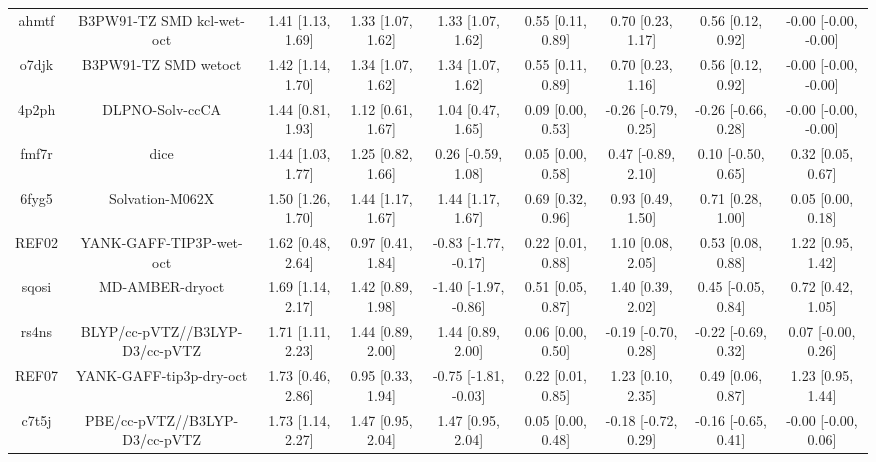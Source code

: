 \documentclass{article}
\begin{document}
\begin{center}
\begin{longtable}{|ccccccccc|}
 ahmtf &                          B3PW91-TZ SMD kcl-wet-oct &  1.41 [1.13, 1.69] &  1.33 [1.07, 1.62] &     1.33 [1.07, 1.62] &  0.55 [0.11, 0.89] &    0.70 [0.23, 1.17] &    0.56 [0.12, 0.92] &  -0.00 [-0.00, -0.00] \\
 o7djk &                               B3PW91-TZ SMD wetoct &  1.42 [1.14, 1.70] &  1.34 [1.07, 1.62] &     1.34 [1.07, 1.62] &  0.55 [0.11, 0.89] &    0.70 [0.23, 1.16] &    0.56 [0.12, 0.92] &  -0.00 [-0.00, -0.00] \\
 4p2ph &                                    DLPNO-Solv-ccCA &  1.44 [0.81, 1.93] &  1.12 [0.61, 1.67] &     1.04 [0.47, 1.65] &  0.09 [0.00, 0.53] &  -0.26 [-0.79, 0.25] &  -0.26 [-0.66, 0.28] &  -0.00 [-0.00, -0.00] \\
 fmf7r &                                               dice &  1.44 [1.03, 1.77] &  1.25 [0.82, 1.66] &    0.26 [-0.59, 1.08] &  0.05 [0.00, 0.58] &   0.47 [-0.89, 2.10] &   0.10 [-0.50, 0.65] &     0.32 [0.05, 0.67] \\
 6fyg5 &                                    Solvation-M062X &  1.50 [1.26, 1.70] &  1.44 [1.17, 1.67] &     1.44 [1.17, 1.67] &  0.69 [0.32, 0.96] &    0.93 [0.49, 1.50] &    0.71 [0.28, 1.00] &     0.05 [0.00, 0.18] \\
 REF02 &                            YANK-GAFF-TIP3P-wet-oct &  1.62 [0.48, 2.64] &  0.97 [0.41, 1.84] &  -0.83 [-1.77, -0.17] &  0.22 [0.01, 0.88] &    1.10 [0.08, 2.05] &    0.53 [0.08, 0.88] &     1.22 [0.95, 1.42] \\
 sqosi &                                    MD-AMBER-dryoct &  1.69 [1.14, 2.17] &  1.42 [0.89, 1.98] &  -1.40 [-1.97, -0.86] &  0.51 [0.05, 0.87] &    1.40 [0.39, 2.02] &   0.45 [-0.05, 0.84] &     0.72 [0.42, 1.05] \\
 rs4ns &                     BLYP/cc-pVTZ//B3LYP-D3/cc-pVTZ &  1.71 [1.11, 2.23] &  1.44 [0.89, 2.00] &     1.44 [0.89, 2.00] &  0.06 [0.00, 0.50] &  -0.19 [-0.70, 0.28] &  -0.22 [-0.69, 0.32] &    0.07 [-0.00, 0.26] \\
 REF07 &                            YANK-GAFF-tip3p-dry-oct &  1.73 [0.46, 2.86] &  0.95 [0.33, 1.94] &  -0.75 [-1.81, -0.03] &  0.22 [0.01, 0.85] &    1.23 [0.10, 2.35] &    0.49 [0.06, 0.87] &     1.23 [0.95, 1.44] \\
 c7t5j &                      PBE/cc-pVTZ//B3LYP-D3/cc-pVTZ &  1.73 [1.14, 2.27] &  1.47 [0.95, 2.04] &     1.47 [0.95, 2.04] &  0.05 [0.00, 0.48] &  -0.18 [-0.72, 0.29] &  -0.16 [-0.65, 0.41] &   -0.00 [-0.00, 0.06] \\

\end{longtable}
\end{center}
\end{document}
